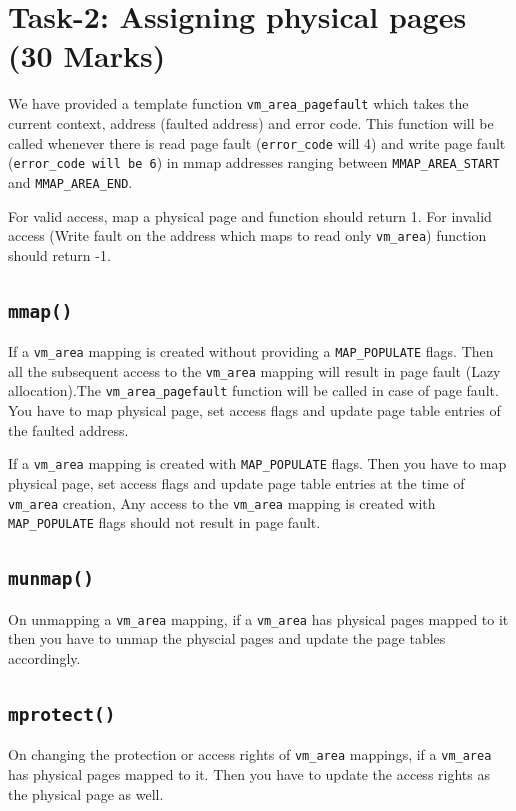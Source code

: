 \documentclass[12pt]{article}
\begin{document}
\newpage
\section*{Task-2: Assigning physical pages (30 Marks)}

We have provided a template function {\tt vm\_area\_pagefault} which takes the current context, address (faulted address) and error code. This function will be called whenever there is read page fault ({\tt error\_code} will 4) and write page fault ({\tt error\_code will be 6}) in mmap addresses ranging between {\tt MMAP\_AREA\_START} and {\tt MMAP\_AREA\_END}. 

For valid access, map a physical page and function should return 1. For invalid access (Write fault on the address which maps to read only {\tt vm\_area}) function should return -1.

\subsection*{\tt mmap()}
    If a {\tt vm\_area} mapping is created without providing a  {\tt MAP\_POPULATE} flags. Then all the subsequent access to the {\tt vm\_area} mapping will result in page fault (Lazy allocation).The {\tt vm\_area\_pagefault} function will be called in case of page fault. You have to map physical page, set access flags and update page table entries of the faulted address.
    
    If  a {\tt vm\_area} mapping is created with {\tt MAP\_POPULATE} flags. Then you have to map physical page, set access flags and update page table entries at the time of {\tt vm\_area} creation,  Any access to the {\tt vm\_area} mapping is created with {\tt MAP\_POPULATE} flags should not result in page fault.

\subsection*{\tt munmap()}
    On unmapping a {\tt vm\_area} mapping, if a {\tt vm\_area} has physical pages mapped to it then you have to unmap the physcial pages and update the page tables accordingly.

\subsection*{\tt mprotect()}
    On changing the protection or access rights of  {\tt vm\_area} mappings, if a {\tt vm\_area} has physical pages mapped to it. Then you have to update the access rights as the physical page as well.
\end{document}
